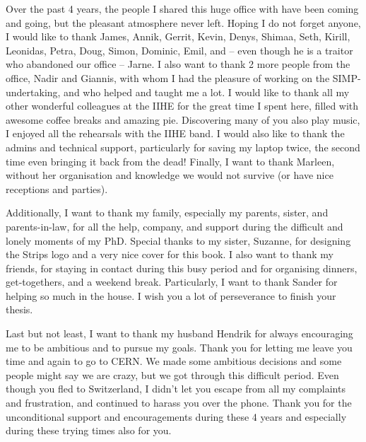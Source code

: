 Over the past 4 years, the people I shared this huge office with have been coming and going, but the pleasant atmosphere never left. Hoping I do not forget anyone, I would like to thank James, Annik, Gerrit, Kevin, Denys, Shimaa, Seth, Kirill, Leonidas, Petra, Doug, Simon, Dominic, Emil, and -- even though he is a traitor who abandoned our office -- Jarne. I also want to thank 2 more people from the office, Nadir and Giannis, with whom I had the pleasure of working on the SIMP-undertaking, and who helped and taught me a lot. I would like to thank all my other wonderful colleagues at the IIHE for the great time I spent here, filled with awesome coffee breaks and amazing pie. Discovering many of you also play music, I enjoyed all the rehearsals with the IIHE band. I would also like to thank the admins and technical support, particularly for saving my laptop twice, the second time even bringing it back from the dead! Finally, I want to thank Marleen, without her organisation and knowledge we would not survive (or have nice receptions and parties).

Additionally, I want to thank my family, especially my parents, sister, and parents-in-law, for all the help, company, and support during the difficult and lonely moments of my PhD. Special thanks to my sister, Suzanne, for designing the Strips logo and a very nice cover for this book. I also want to thank my friends, for staying in contact during this busy period and for organising dinners, get-togethers, and a weekend break. Particularly, I want to thank Sander for helping so much in the house. I wish you a lot of perseverance to finish your thesis.

Last but not least, I want to thank my husband Hendrik for always encouraging me to be ambitious and to pursue my goals. Thank you for letting me leave you time and again to go to CERN. We made some ambitious decisions and some people might say we are crazy, but we got through this difficult period. Even though you fled to Switzerland, I didn't let you escape from all my complaints and frustration, and continued to harass you over the phone. Thank you for the unconditional support and encouragements during these 4 years and especially during these trying times also for you.